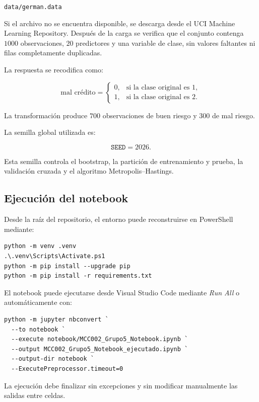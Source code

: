 \begin{center}
    \texttt{data/german.data}
\end{center}

Si el archivo no se encuentra disponible, se descarga desde el UCI Machine
Learning Repository. Después de la carga se verifica que el conjunto
contenga \(1000\) observaciones, \(20\) predictores y una variable de clase,
sin valores faltantes ni filas completamente duplicadas.

La respuesta se recodifica como:

\[
\text{mal crédito}
=
\begin{cases}
0, & \text{si la clase original es }1,\\
1, & \text{si la clase original es }2.
\end{cases}
\]

La transformación produce \(700\) observaciones de buen riesgo y \(300\)
de mal riesgo.

La semilla global utilizada es:

\[
\texttt{SEED}=2026.
\]

Esta semilla controla el bootstrap, la partición de entrenamiento y prueba,
la validación cruzada y el algoritmo Metropolis--Hastings.

\subsection{Ejecución del notebook}

Desde la raíz del repositorio, el entorno puede reconstruirse en PowerShell
mediante:

\begin{verbatim}
python -m venv .venv
.\.venv\Scripts\Activate.ps1
python -m pip install --upgrade pip
python -m pip install -r requirements.txt
\end{verbatim}

El notebook puede ejecutarse desde Visual Studio Code mediante
\textit{Run All} o automáticamente con:

\begin{verbatim}
python -m jupyter nbconvert `
  --to notebook `
  --execute notebook/MCC002_Grupo5_Notebook.ipynb `
  --output MCC002_Grupo5_Notebook_ejecutado.ipynb `
  --output-dir notebook `
  --ExecutePreprocessor.timeout=0
\end{verbatim}

La ejecución debe finalizar sin excepciones y sin modificar manualmente las
salidas entre celdas.

